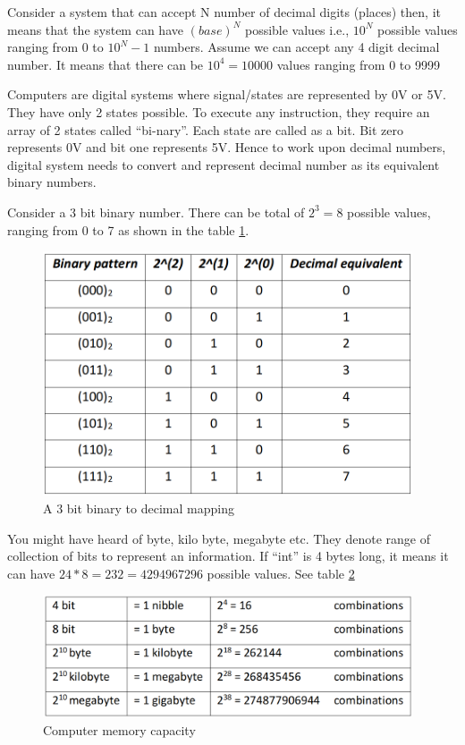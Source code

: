 \par Consider a system that can accept N number of decimal digits (places) then, it means that the system can have $(base)^N$ possible values i.e., $10^N$ possible values ranging from 0 to $10^N - 1$ numbers. Assume we can accept any 4 digit decimal number. It means that there can be $10^4 = 10000$ values ranging from 0 to 9999 

\par Computers are digital systems where signal/states are represented by 0V or 5V. They have only 2 states possible. To execute any instruction, they require an array of 2 states called “bi-nary”. Each state are called as a bit. Bit zero represents 0V and bit one represents 5V. Hence to work upon decimal numbers, digital system needs to convert and represent decimal number as its equivalent binary numbers.

\par Consider a 3 bit binary number. There can be total of $2^3 = 8$ possible values, ranging from 0 to 7 as shown in the table \ref{fig:binary}.

\begin{figure}
    \centering
    \includegraphics[width=4.3in]{Tables/DTMF/binary_system.png}
    \caption[Binary system]{A 3 bit binary to decimal mapping}
    \label{fig:binary}
\end{figure}

\par You might have heard of byte, kilo byte, megabyte etc. They denote range of collection of bits to represent an information. If “int” is 4 bytes long, it means it can have $24*8 = 232 = 4294967296$ possible values. See table \ref{fig:memory_size}

\begin{figure}
    \centering
    \includegraphics[width=4.3in]{Tables/DTMF/computer_memory.png}
    \caption[Memory size]{Computer memory capacity}
    \label{fig:memory_size}
\end{figure}

